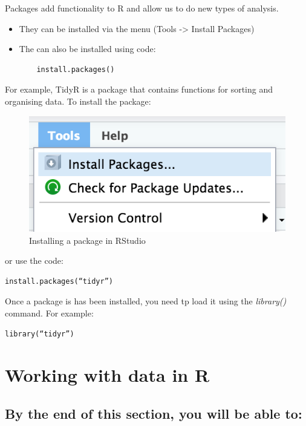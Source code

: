 \documentclass[
]{book}
\begin{document}
Packages add functionality to R and allow us to do new types of analysis.

\begin{itemize}
\item
  They can be installed via the menu (Tools -\textgreater{} Install Packages)
\item
  The can also be installed using code:

\begin{verbatim}
    install.packages()
\end{verbatim}
\end{itemize}

For example, TidyR is a package that contains functions for sorting and organising data. To install the package:

\begin{figure}
\centering
\includegraphics{images/installPackages.png}
\caption{Installing a package in RStudio}
\end{figure}

or use the code:

\begin{verbatim}
install.packages(“tidyr”)
\end{verbatim}

Once a package is has been installed, you need tp load it using the \emph{library()} command.
For example:

\begin{verbatim}
library(“tidyr”)
\end{verbatim}

\hypertarget{working-with-data-in-r}{%
\chapter{Working with data in R}\label{working-with-data-in-r}}

\hypertarget{by-the-end-of-this-section-you-will-be-able-to}{%
\section{By the end of this section, you will be able to:}\label{by-the-end-of-this-section-you-will-be-able-to}}
\end{document}
